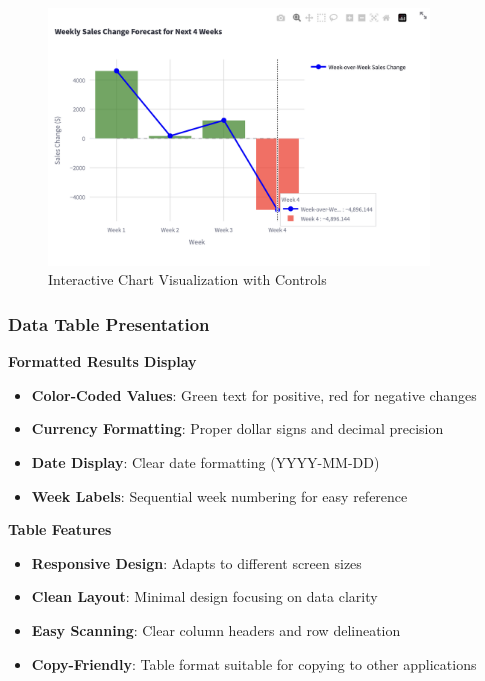 \begin{figure}[H]
	\centering
	\includegraphics[width=0.9\textwidth]{Images/05ApplicationFunctionsAndFeatures/InteractiveVisualization.png}
	\caption{Interactive Chart Visualization with Controls}
	\label{fig:interactive_visualization}
\end{figure}

\subsubsection{Data Table Presentation}

\textbf{Formatted Results Display}
\begin{itemize}
	\item \textbf{Color-Coded Values}: Green text for positive, red for negative changes
	\item \textbf{Currency Formatting}: Proper dollar signs and decimal precision
	\item \textbf{Date Display}: Clear date formatting (YYYY-MM-DD)
	\item \textbf{Week Labels}: Sequential week numbering for easy reference
\end{itemize}

\textbf{Table Features}
\begin{itemize}
	\item \textbf{Responsive Design}: Adapts to different screen sizes
	\item \textbf{Clean Layout}: Minimal design focusing on data clarity
	\item \textbf{Easy Scanning}: Clear column headers and row delineation
	\item \textbf{Copy-Friendly}: Table format suitable for copying to other applications
\end{itemize}

